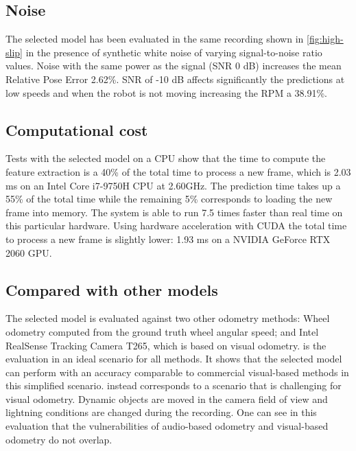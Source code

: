 
\subsection{Noise} The selected model has been evaluated in the same recording
shown in \cref{fig:high-slip} in the presence of synthetic white noise of
varying signal-to-noise ratio values. Noise with the same power as the signal
(SNR 0 dB) increases the mean Relative Pose Error 2.62\%. SNR of -10 dB affects
significantly the predictions at low speeds and when the robot is not moving
increasing the RPM a 38.91\%.


\subsection{Computational cost} Tests with the selected model on a CPU show
that the time to compute the feature extraction is a 40\% of the total time to
process a new frame, which is 2.03 ms on an Intel\textregistered{}
Core\texttrademark{} i7-9750H CPU at 2.60GHz. The prediction time takes up a
55\% of the total time while the remaining 5\% corresponds to loading the new
frame into memory. The system is able to run 7.5 times faster than real time on
this particular hardware. Using hardware acceleration with CUDA the total time
to process a new frame is slightly lower: 1.93 ms on a NVIDIA GeForce RTX 2060
GPU.

\subsection{Compared with other models} The selected model is evaluated against
two other odometry methods: Wheel odometry computed from the ground truth wheel
angular speed; and Intel\textregistered{} RealSense\texttrademark{} Tracking
Camera T265, which is based on visual odometry.  is the
evaluation in an ideal scenario for all methods. It shows that the selected
model can perform with an accuracy comparable to commercial visual-based
methods in this simplified scenario.  instead
corresponds to a scenario that is challenging for visual odometry. Dynamic
objects are moved in the camera field of view and lightning conditions are
changed during the recording. One can see in this evaluation that the
vulnerabilities of audio-based odometry and visual-based odometry do not
overlap.

